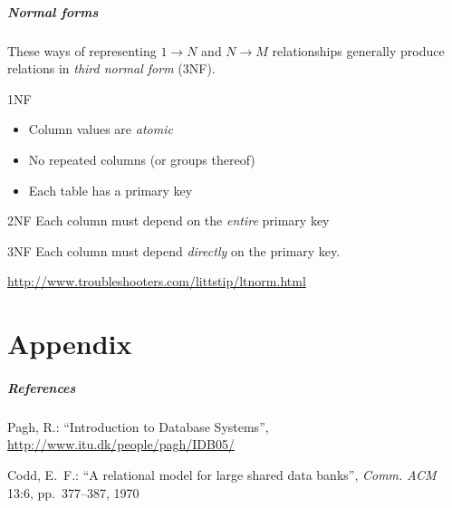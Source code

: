 \documentclass[english,serif,mathserif]{beamer}
\begin{document}
\begin{frame}
  \frametitle{Normal forms}\small

  These ways of representing $1 \to N$ and $N \to M$ relationships generally
  produce relations in \emph{third normal form} (3NF).

  \begin{describe}{1NF}
    \begin{itemize}
    \item Column values are \emph{atomic}
    \item No repeated columns (or groups thereof)
    \item Each table has a primary key
    \end{itemize}
  \end{describe}

  \begin{describe}{2NF}
    Each column must depend on the \emph{entire} primary key
  \end{describe}

  \begin{describe}{3NF}
    Each column must depend \emph{directly} on the primary key.
  \end{describe}

  \begin{seealso}
    \url{http://www.troubleshooters.com/littstip/ltnorm.html}
  \end{seealso}
\end{frame}


\part{Appendix}
\begin{frame}
  \frametitle{References}

  Pagh, R.: ``Introduction to Database Systems'',
  \url{http://www.itu.dk/people/pagh/IDB05/}

  \+
  Codd, E.~F.: ``A relational model for large shared data banks'', \emph{Comm.
  ACM} 13:6, pp.~377--387, 1970
\end{frame}
\end{document}
